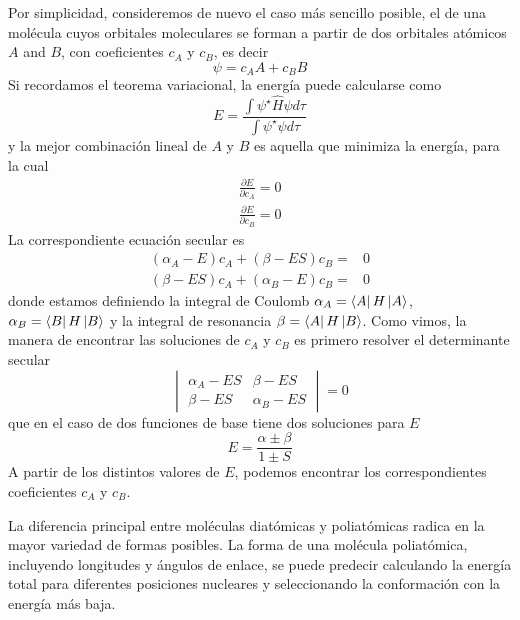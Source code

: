 \documentclass{tufte-handout}
\begin{document}
Por simplicidad, consideremos de nuevo el caso más sencillo 
posible, el de una molécula cuyos orbitales moleculares 
se forman a partir de dos orbitales atómicos $A$ and $B$,
con coeficientes $c_A$ y $c_B$, es decir
\begin{equation}
\psi=c_AA+c_BB
\end{equation}
Si recordamos el teorema variacional, la energía puede calcularse
como 
\begin{equation}
E=\frac{\int \psi^\star \hat{H}\psi d\tau}{\int \psi^\star\psi d\tau}
\end{equation}
y la mejor combinación lineal de $A$ y $B$ es aquella que 
minimiza la energía, para la cual
\begin{align}
	\frac{\partial E}{\partial c_A}=0 \\
	\frac{\partial E}{\partial c_B}=0
\end{align}
La correspondiente ecuación secular es 
\begin{align}
	(\alpha_A - E)c_A +(\beta-ES)c_B =& 0 \\
	(\beta - ES)c_A +(\alpha_B-E)c_B =& 0
\end{align}
donde estamos definiendo la integral de Coulomb 
$\alpha_A=\bra{A}H\ket{A}$, $\alpha_B=\bra{B}H\ket{B}$
y la integral de resonancia $\beta=\bra{A}H\ket{B}$. Como
vimos, la manera de encontrar las soluciones de $c_A$ y $c_B$
es primero resolver el determinante secular
\begin{equation}
\begin{vmatrix}
 \alpha_A-ES &  \beta - ES \\ 
 \beta-ES &  \alpha_B-ES
\end{vmatrix}= 0
\end{equation}
que en el caso de dos funciones de base tiene dos soluciones
para $E$
\begin{equation}
	E=\frac{\alpha\pm\beta}{1\pm S}
\end{equation}
A partir de los distintos valores de $E$, podemos encontrar
los correspondientes coeficientes $c_A$ y $c_B$.

La diferencia principal entre moléculas diatómicas y poliatómicas
radica en la mayor variedad de formas posibles. La forma de una
molécula poliatómica, incluyendo longitudes y ángulos de enlace, 
se puede predecir calculando la energía total para diferentes
posiciones nucleares y seleccionando la conformación con la 
energía más baja.
\end{document}
